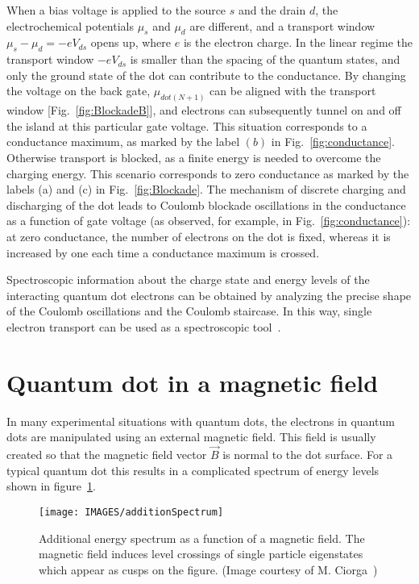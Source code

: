 When a bias voltage is applied to the source $s$ and the drain $d$, the electrochemical potentials $\mu_s$ and $\mu_d$ are different, and a transport window $\mu_s -\mu_d=-eV_{ds}$ opens up, where $e$ is the electron charge.
In the linear regime the transport window $-eV_{ds}$ is smaller than the spacing of the quantum states, and only the ground state of the dot can contribute to the conductance.
By changing the voltage on the back gate, $\mu_{dot(N+1)}$ can be aligned with the transport window [Fig.~\ref{fig:BlockadeB}], and electrons can subsequently tunnel on and off the island at this particular gate voltage. This situation corresponds to a conductance maximum, as marked by the label $(b)$ in Fig.~\ref{fig:conductance}.
Otherwise transport is blocked, as a finite energy is needed to overcome the charging energy. This scenario corresponds to zero conductance as marked by the labels (a) and (c) in Fig.~\ref{fig:Blockade}. The mechanism of discrete charging and discharging of the dot leads to Coulomb blockade oscillations in the conductance as a function of gate voltage (as observed, for example, in Fig.~\ref{fig:conductance}): at zero conductance, the number of electrons on the dot is fixed, whereas it is increased by one each time a conductance maximum is crossed.~\cite{reimannManninen}

Spectroscopic information about the charge state and energy levels of the interacting quantum dot electrons can be obtained by analyzing the precise shape of the Coulomb oscillations and the Coulomb staircase. In this way, single electron transport can be used as a spectroscopic tool~\cite{Mizuta2001}.

\section{Quantum dot in a magnetic field}


In many experimental situations with quantum dots, the electrons in quantum dots are manipulated using an external magnetic field. This field is usually created so that the magnetic field vector $\overrightarrow{B}$ is normal to the dot surface. For a typical quantum dot this results in a complicated spectrum of energy levels shown in figure~\ref{fig:additionSpectrum}.

\begin{figure}
\centering
\texttt{[image: IMAGES/additionSpectrum]}
\caption{Additional energy spectrum as a function of a magnetic field. The magnetic field induces level crossings of single particle eigenstates which appear as cusps on the figure. (Image courtesy of M. Ciorga~\cite{Ciorga2000})}
\label{fig:additionSpectrum}
\end{figure}

